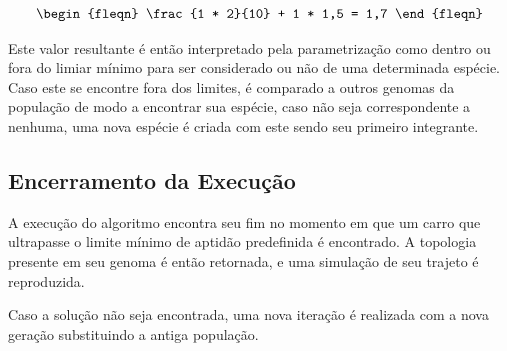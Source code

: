\begin{equation}
\begin{fleqn}
\frac{1 * 2}{10} + 1 * 1,5 = 1,7
\end{fleqn}
\end{equation}


Este valor resultante é então interpretado pela parametrização como dentro ou fora do
limiar mínimo para ser considerado ou não de uma determinada espécie. Caso este se
encontre fora dos limites, é comparado a outros genomas da população de modo a encontrar
sua espécie, caso não seja correspondente a nenhuma, uma nova espécie é criada com este sendo seu primeiro integrante.

\subsection{Encerramento da Execução}
A execução do algoritmo encontra seu fim no momento em que um carro
que ultrapasse o limite mínimo de aptidão predefinida é encontrado.
A topologia presente em seu genoma é então retornada, e uma simulação de seu trajeto é reproduzida.

Caso a solução não seja encontrada, uma nova iteração é realizada com a nova geração substituindo a antiga população.
